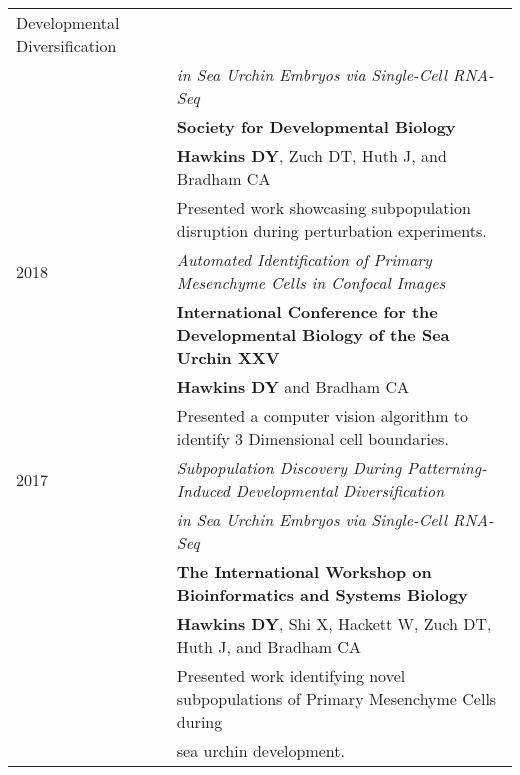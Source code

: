 \documentclass[a4paper,10pt]{report}
\begin{document}
\begin{longtable}{ll}
{	Developmental Diversification}                                                                                      \\
	              & \emph{in Sea Urchin Embryos via Single-Cell RNA-Seq}                                                \\
	              & \textbf{Society for Developmental Biology}                                                          \\
	              & \footnotesize \textbf{Hawkins DY}, Zuch DT, Huth J, and Bradham CA                                  \\
	              & \small{Presented work showcasing subpopulation disruption
	during perturbation experiments.}                                                                                   \\
	\textsc{2018} & \emph{Automated Identification of Primary Mesenchyme Cells
	in Confocal Images}                                                                                                 \\
	              & \textbf{International Conference for the Developmental Biology of
	the Sea Urchin XXV}                                                                                                 \\
	              & \footnotesize \textbf{Hawkins DY} and Bradham CA                                                    \\
	              & \small{Presented a computer vision algorithm to identify 3
	Dimensional cell boundaries.}                                                                                       \\
	\textsc{2017} & \emph{Subpopulation Discovery During Patterning-Induced
	Developmental Diversification}                                                                                      \\
	              & \emph{in Sea Urchin Embryos via Single-Cell RNA-Seq}                                                \\
	              & \textbf{The International Workshop on Bioinformatics and Systems Biology}                           \\
	              & \footnotesize \textbf{Hawkins DY}, Shi X, Hackett W, Zuch DT, Huth J, and Bradham CA                \\
	              & \small{Presented work identifying novel subpopulations of Primary
	Mesenchyme Cells during}                                                                                            \\
	              & \small{sea urchin development.}                                                                     \\


\end{longtable}
\end{document}
